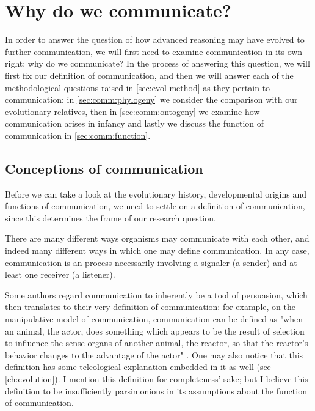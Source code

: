 \chapter{Why do we communicate?}
\label{ch:communication}

In order to answer the question of how advanced reasoning may have evolved to further communication, we will first need to examine communication in its own right: why do we communicate?
In the process of answering this question, we will first fix our definition of communication, and then we will answer each of the methodological questions raised in \cref{sec:evol-method} as they pertain to communication: in \cref{sec:comm:phylogeny} we consider the comparison with our evolutionary relatives, then in \cref{sec:comm:ontogeny} we examine how communication arises in infancy and lastly we discuss the function of communication in \cref{sec:comm:function}.

\section{Conceptions of communication}
\label{sec:comm:definition}

Before we can take a look at the evolutionary history, developmental origins and functions of communication, we need to settle on a definition of communication, since this determines the frame of our research question.

There are many different ways organisms may communicate with each other, and indeed many different ways in which one may define communication. In any case, communication is an process necessarily involving a signaler (a sender) and at least one receiver (a listener).

Some authors regard communication to inherently be a tool of persuasion, which then translates to their very definition of communication: for example, on the manipulative model of communication, communication can be defined as "when an animal, the actor, does something which appears to be the result of selection to influence the sense organs of another animal, the reactor, so that the reactor's behavior changes to the advantage of the actor" \citep[p.~283]{DawkinsKrebs78}.
One may also notice that this definition has some teleological explanation embedded in it as well (see \cref{ch:evolution}).
I mention this definition for completeness' sake; but I believe this definition to be insufficiently parsimonious in its assumptions about the function of communication.

